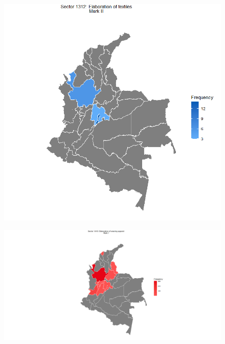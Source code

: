 \documentclass{beamer}
\begin{document}
\begin{frame}[allowframebreaks]
\begin{figure}
			\centering
			\includegraphics[scale=0.25]{textilesElabor.png}
		\end{figure}
	\framebreak
		\begin{figure}
			\centering
			\includegraphics[scale=0.2]{wear.png}
		\end{figure}
	\framebreak		
	\begin{figure}
		\centering

\end{figure}
\end{frame}
\end{document}
